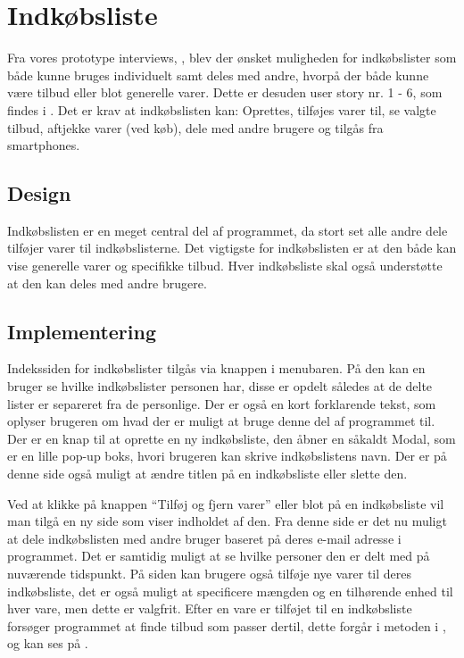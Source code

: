 \section{Indkøbsliste} 
Fra vores prototype interviews, , blev der ønsket muligheden for indkøbslister som både kunne bruges individuelt samt deles med andre, hvorpå der både kunne være tilbud eller blot generelle varer. 
Dette er desuden user story nr. 1 - 6, som findes i . 
Det er krav at indkøbslisten kan: Oprettes, tilføjes varer til, se valgte tilbud, aftjekke varer (ved køb), dele med andre brugere og tilgås fra smartphones.

\subsection{Design}

Indkøbslisten er en meget central del af programmet, da stort set alle andre dele tilføjer varer til indkøbslisterne.
Det vigtigste for indkøbslisten er at den både kan vise generelle varer og specifikke tilbud. 
Hver indkøbsliste skal også understøtte at den kan deles med andre brugere. 
\subsection{Implementering}

Indekssiden for indkøbslister tilgås via knappen i menubaren.
På den kan en bruger se hvilke indkøbslister personen har, disse er opdelt således at de delte lister er separeret fra de personlige.
Der er også en kort forklarende tekst, som oplyser brugeren om hvad der er muligt at bruge denne del af programmet til.
Der er en knap til at oprette en ny indkøbsliste, den åbner en såkaldt Modal, som er en lille pop-up boks, hvori brugeren kan skrive indkøbslistens navn. 
Der er på denne side også muligt at ændre titlen på en indkøbsliste eller slette den.

Ved at klikke på knappen ``Tilføj og fjern varer'' eller blot på en indkøbsliste vil man tilgå en ny side som viser indholdet af den.
Fra denne side er det nu muligt at dele indkøbslisten med andre bruger baseret på deres e-mail adresse i programmet.
Det er samtidig muligt at se hvilke personer den er delt med på nuværende tidspunkt.
På siden kan brugere også tilføje nye varer til deres indkøbsliste, det er også muligt at specificere mængden og en tilhørende enhed til hver vare, men dette er valgfrit.
Efter en vare er tilføjet til en indkøbsliste forsøger programmet at finde tilbud som passer dertil, dette forgår i metoden  i , og kan ses på .

